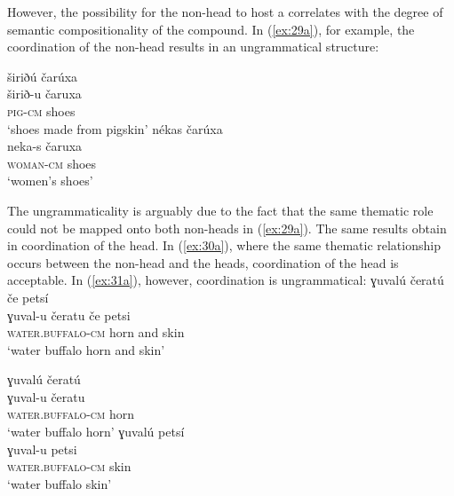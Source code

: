 \documentclass[output=paper]{LSP/langsci}
\begin{document}
However, the possibility for the non-head to host a  correlates with the degree of semantic compositionality of the compound. In (\ref{ex:29a}), for example, the coordination of the non-head results in an ungrammatical structure:
\ea\label{ex:29}
\begin{multicols}{2}
	\ex\label{ex:29b}
		\glll	širiðú čarúxa\\
				širið-u čaruxa\\
				\textsc{pig-cm} shoes\\
		\glt `shoes made from pigskin'
	\ex\label{ex:29c}
		\glll nékas čarúxa\\
				neka-s čaruxa\\
				\textsc{woman-cm} shoes\\
		\glt `women's shoes'
\end{multicols}
	\z
\z
The ungrammaticality is arguably due to the fact that the same thematic role could not be  mapped onto both non-heads in (\ref{ex:29a}). The same results obtain in coordination of the head. In (\ref{ex:30a}), where the same thematic relationship occurs between the non-head and the heads, coordination of the head is acceptable. In (\ref{ex:31a}), however, coordination is ungrammatical:
\ea\label{ex:30}
	\ea\label{ex:30a}
		\glll	ɣuvalú čeratú če petsí\\
				ɣuval-u čeratu če petsi\\
				\textsc{water.buffalo-cm} horn and skin\\
			\glt `water buffalo horn and skin'
\begin{multicols}{2}
	\ex\label{ex:30b}
		\glll	ɣuvalú čeratú \\
				ɣuval-u čeratu\\
				\textsc{water.buffalo-cm} horn\\
		\glt `water buffalo horn'
	\ex\label{ex:30c}
		\glll	ɣuvalú petsí\\
				ɣuval-u petsi\\
				\textsc{water.buffalo-cm} skin\\
		\glt `water buffalo skin'
\end{multicols}
	\z
\z
\ea\label{ex:31}
\end{document}

